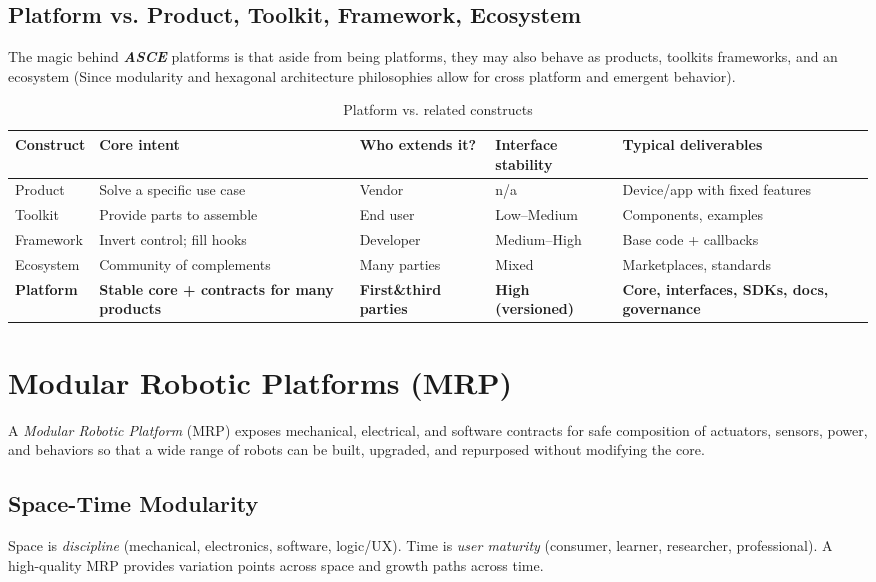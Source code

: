 \subsection{Platform vs. Product, Toolkit, Framework, Ecosystem}\label{subsec:platform-comparison}
The magic behind \textbf{\textit{ASCE}} platforms is that aside from being platforms, they may also behave as products, toolkits frameworks, and an ecosystem (Since modularity and hexagonal architecture philosophies allow for cross platform and emergent behavior).
\begin{table}[h]
\centering
\caption{Platform vs. related constructs}
\renewcommand{\arraystretch}{1.15}
\begin{tabularx}{\textwidth}{lXXXX}
\toprule
\textbf{Construct} & \textbf{Core intent} & \textbf{Who extends it?} & \textbf{Interface stability} & \textbf{Typical deliverables} \\
\midrule
Product   & Solve a specific use case             & Vendor             & n/a           & Device/app with fixed features \\
Toolkit   & Provide parts to assemble             & End user           & Low--Medium   & Components, examples \\
Framework & Invert control; fill hooks            & Developer          & Medium--High  & Base code + callbacks \\
Ecosystem & Community of complements              & Many parties       & Mixed         & Marketplaces, standards \\
\textbf{Platform} & \textbf{Stable core + contracts for many products} & \textbf{First\&third parties} & \textbf{High (versioned)} & \textbf{Core, interfaces, SDKs, docs, governance} \\
\bottomrule
\end{tabularx}
\end{table}

\section{Modular Robotic Platforms (MRP)}\label{sec:mrp}
A \emph{Modular Robotic Platform} (MRP) exposes mechanical, electrical, and software contracts for safe composition of actuators, sensors, power, and behaviors so that a wide range of robots can be built, upgraded, and repurposed without modifying the core.

\subsection{Space-Time Modularity}\label{subsec:space-time}
Space is \emph{discipline} (mechanical, electronics, software, logic/UX). Time is \emph{user maturity} (consumer, learner, researcher, professional). A high-quality MRP provides variation points across space and growth paths across time.

